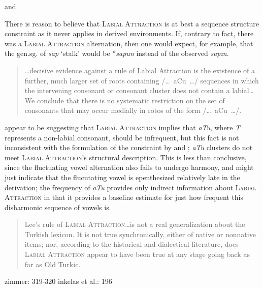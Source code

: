 \citet[225]{Clements1982} and \citet{Inkelas2001}

There is reason to believe that \textsc{Labial Attraction} is at best a sequence structure constraint as it never applies in derived environments. If, contrary to fact, there was a \textsc{Labial Attraction} alternation, then one would expect, for example, that the gen.sg. of \emph{sap} `stalk' would be *\emph{sapun} instead of the observed \emph{sapın}.

\citet{Lees1966a}
\citet{Zimmer1969}

\begin{quote}
\ldots decisive evidence against a rule of Labial Attraction is the existence of a further, much larger set of roots containing /\ldots~aCu~\ldots/ sequences in which the intervening consonant or consonant cluster does not contain a labial\ldots We conclude that there is no systematic restriction on the set of consonants that may occur medially in rotos of the form /\ldots~aCu~\ldots/. \citep[][225]{Clements1982}
\end{quote}

\noindent
\citeauthor{Clements1982} appear to be suggesting that \textsc{Labial Attraction} implies that \emph{aTu}, where \emph{T} represents a non-labial consonant, should be infrequent, but this fact is not inconsistent with the formulation of the constraint by \citet{Lees1966a,Lees1966b} and \citet{Zimmer1969}; \emph{aTu} clusters do not meet \textsc{Labial Attraction}'s structural description. This is less than conclusive, since the fluctuating vowel alternation also fails to undergo harmony, and might just indicate that the flucutating vowel is epenthesized relatively late in the derivation; the frequency of \emph{aTu} provides only indirect information about \textsc{Labial Attraction} in that it provides a baseline estimate for just how frequent this disharmonic sequence of vowels is.

\citet{Inkelas1997}
\citet{Inkelas2001}

\begin{quote}
Lee's rule of \textsc{Labial Attraction}\ldots is not a real generalization about the Turkish lexicon. It is not true synchronically, either of native or nonnative items; nor, according to the historical and dialectical literature, does \textsc{Labial Attraction} appear to have been true at any stage going back as far as Old Turkic. \citep[][196]{Inkelas2001}
\end{quote}

zimmer: 319-320 
inkelas et al.: 196

